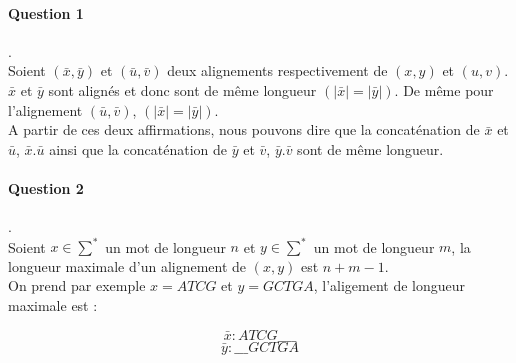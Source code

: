 \paragraph{Question 1}.\\
Soient $(\bar x,\bar y)$ et $(\bar u, \bar v)$ deux alignements respectivement de $(x, y)$ et $(u, v)$. $\bar x$ et $\bar y$ sont alignés et donc sont de même longueur $(|\bar x| = |\bar y|)$. De même pour l'alignement $(\bar u, \bar v)$, $(|\bar x| = |\bar y|)$.\\
A partir de ces deux affirmations, nous pouvons dire que la concaténation de $\bar x$ et $\bar u$, $\bar x.\bar u$ ainsi que la concaténation de $\bar y$ et $\bar v$, $\bar y.\bar v$ sont de même longueur.

\paragraph{Question 2}.\\
Soient $x \in \sum^*$ un mot de longueur $n$ et $y \in \sum^*$ un mot de longueur $m$, la longueur maximale d'un alignement de $(x,y)$ est $n+m-1$.\\
On prend par exemple $x=ATCG$ et $y=GCTGA$, l'aligement de longueur maximale est :

$$\bar x : ATCG\_\_\_\_$$
$$\bar y : \_\_\_GCTGA$$
